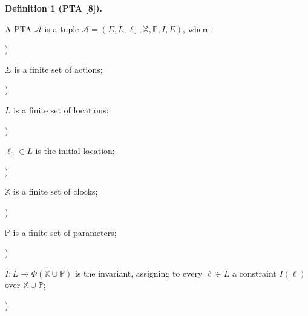 \documentclass[10pt,a4paper]{article}
\begin{document}
 
 
\par\medskip\noindent\textbf{Definition 1 (PTA [8]).}\par
 
 
A PTA $\mathcal{A}$ is a tuple $\mathcal{A}=(\Sigma,L,\mathrm{\mathrm{\ell}_{0}},\mathbb{X},\mathbb{P},I,E)$, where:\par
  
\par{}) 
 
$\Sigma$ is a finite set of actions;\par
 
 
 
\par{}) 
 
$L$ is a finite set of locations;\par
 
 
 
\par{}) 
 
$\mathrm{\mathrm{\ell}_{0}}\in L$ is the initial location;\par
 
 
 
\par{}) 
 
$\mathbb{X}$ is a finite set of clocks;\par
 
 
 
\par{}) 
 
$\mathbb{P}$ is a finite set of parameters;\par
 
 
 
\par{}) 
 
$I:L\to\Phi(\mathbb{X}\cup\mathbb{P})$ is the invariant, assigning to every $\mathrm{\ell}\in L$ a constraint $I(\mathrm{\ell})$ over $\mathbb{X}\cup\mathbb{P}$;\par
 
 
 
\par{}) 
 
\end{document}
